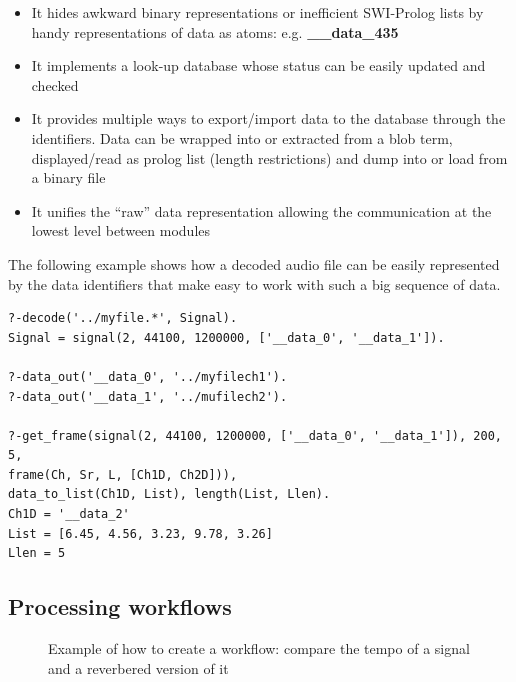 \documentclass[runningheads]{llncs}
\begin{document}
\begin{itemize}
 \item It hides awkward binary representations or inefficient SWI-Prolog lists by handy representations of data as atoms: e.g. \textbf{\_\_data\_435}
 \item It implements a look-up database whose status can be easily updated and checked
 \item It provides multiple ways to export/import data to the database through the identifiers. Data can be wrapped into or extracted from a blob term, displayed/read as prolog list (length restrictions) and dump into or load from a binary file
 \item It unifies the ``raw'' data representation allowing the communication at the lowest level between modules 
\end{itemize}

The following example shows how a decoded audio file can be easily represented by the data identifiers that make easy to work with such a big sequence of data.
\begin{verbatim}
?-decode('../myfile.*', Signal).
Signal = signal(2, 44100, 1200000, ['__data_0', '__data_1']).

?-data_out('__data_0', '../myfilech1').
?-data_out('__data_1', '../mufilech2').

?-get_frame(signal(2, 44100, 1200000, ['__data_0', '__data_1']), 200, 5,
frame(Ch, Sr, L, [Ch1D, Ch2D])),
data_to_list(Ch1D, List), length(List, Llen).
Ch1D = '__data_2'
List = [6.45, 4.56, 3.23, 9.78, 3.26]
Llen = 5
\end{verbatim}

\subsection{Processing workflows}\label{subsec:worflow}

\begin{figure}
\centerline{}
\caption{Example of how to create a workflow: compare the tempo of a signal and a reverbered version of it}
\label{fig:workflow}
\end{figure}
\end{document}
